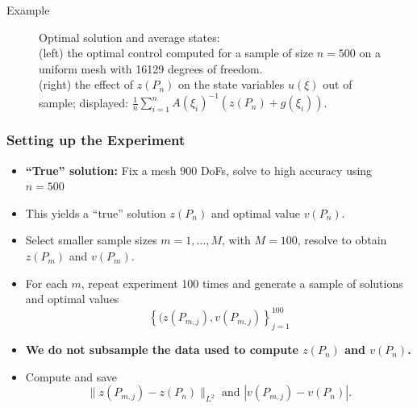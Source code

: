 \documentclass[aspectratio=169,xcolor=dvipsnames,10pt]{beamer}
\begin{document}
\begin{frame}{Example}
\begin{figure}
\qquad   {}\qquad 
\caption{Optimal solution and average states:\\ 
(left) the optimal control computed for a sample of size $n = 500$ on a uniform mesh with 16129 degrees of freedom.\\ 
(right) the effect of $z(P_n)$ on the state variables $u(\xi)$ out of sample; displayed: $\frac{1}{n}\sum_{i=1}^{n} A(\xi_i)^{-1}(z(P_n) + g(\xi_i))$.
\label{fig:fig2}}
\end{figure}
\end{frame}

\begin{frame}\frametitle{Setting up the Experiment}
\begin{exampleblock}{}
    \begin{itemize}
        \item \textbf{``True'' solution:} Fix a mesh $900$ DoFs, solve to high accuracy using $n = 500$
        \item  This yields a ``true'' solution $z(P_n)$ and optimal value $v(P_n)$. 
        \item Select smaller sample sizes $m = 1,\dots,M$, with $M = 100$, resolve to obtain $z(P_m)$ and $v(P_m)$.
        \item For each $m$, repeat experiment 100 times and generate a sample of solutions and optimal values \[
        \left\{(z(P_{m,j}),v(P_{m,j})\right\}_{j=1}^{100}
        \]
        \item \textbf{We do not subsample the data used to compute  $z(P_n)$ and $v(P_n)$.}
        \item Compute and save  
        \[
        \|z(P_{m,j}) - z(P_n)\|_{L^2}
        \text{ and }
        |v(P_{m,j}) - v(P_n)|.
        \]
    \end{itemize}
\end{exampleblock}
\end{frame}
\end{document}
